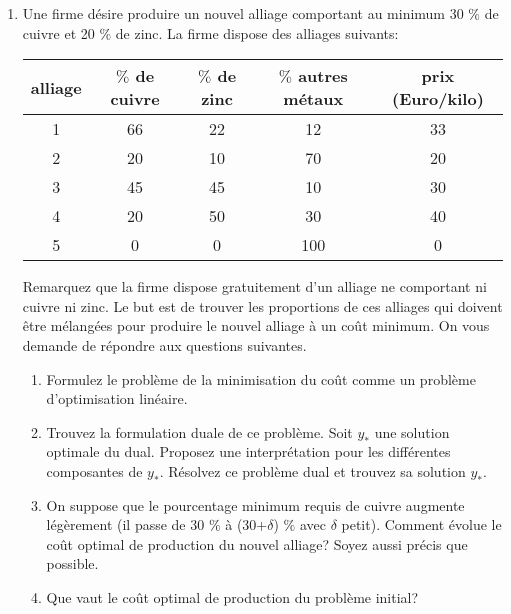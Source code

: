 \begin{enumerate}
\begin{enumerate}
    \end{enumerate}


    \begin{solution}
      \nosolution
    \end{solution}

  \item  Une firme d\'esire produire un nouvel alliage comportant au minimum
    30 $\%$ de cuivre et 20 $\%$ de zinc. La firme dispose des alliages suivants:

    \begin{tabular}{|c|c|c|c|c|}
      \hline
      alliage &  $\%$ de cuivre & $\%$ de zinc & $\%$ autres m\'etaux & prix (Euro/kilo) \\
      \hline
      1 & 66 & 22 & 12 & 33 \\
      \hline
      2 & 20 & 10 & 70 & 20 \\
      \hline
      3 & 45 & 45 & 10 & 30 \\
      \hline
      4 & 20 & 50  & 30 & 40\\
      \hline
      5 & 0 & 0 & 100 & 0 \\
      \hline
    \end{tabular}


    Remarquez que la firme dispose gratuitement d'un alliage ne comportant ni cuivre ni zinc.
    Le but est de trouver les proportions de ces alliages qui doivent
    \^etre m\'elang\'ees  pour produire le nouvel alliage \`a un co\^ut minimum. On vous demande de r\'epondre aux questions suivantes.

    \begin{enumerate}
      \item  Formulez le probl\`eme de la minimisation du co\^ut comme un probl\`eme
        d'optimisation lin\'eaire.

      \item Trouvez la formulation duale de ce probl\`eme. Soit $y_*$ une solution
        optimale du dual. Proposez une interpr\'etation pour les
        diff\'erentes composantes de
        $y_*$. R\'esolvez ce probl\`eme dual et trouvez sa solution $y_*$.
      \item   On suppose que le pourcentage minimum requis de cuivre augmente l\'eg\`erement
        (il passe de 30 $\%$ \`a (30+$\delta$) $\%$ avec $\delta$ petit).
        Comment \'evolue le co\^ut optimal de production du nouvel alliage?
        Soyez aussi pr\'ecis que possible.

      \item Que vaut le co\^ut optimal de production du probl\`eme initial?
    \end{enumerate}





\end{enumerate}
